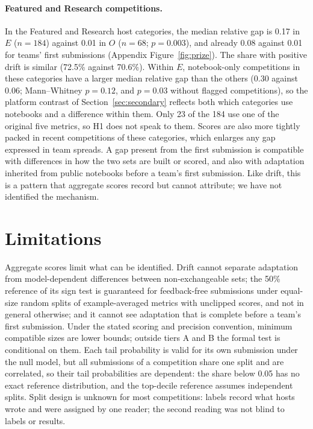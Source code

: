 \documentclass[10pt]{article}
\begin{document}
\paragraph{Featured and Research competitions.} In the Featured and Research host categories, the median relative gap is 0.17 in $E$ ($n=184$) against 0.01 in $O$ ($n=68$; $p=0.003$), and already 0.08 against 0.01 for teams' first submissions (Appendix Figure~\ref{fig:prize}). The share with positive drift is similar (72.5\% against 70.6\%). Within $E$, notebook-only competitions in these categories have a larger median relative gap than the others (0.30 against 0.06; Mann--Whitney $p=0.12$, and $p=0.03$ without flagged competitions), so the platform contrast of Section~\ref{sec:secondary} reflects both which categories use notebooks and a difference within them. Only 23 of the 184 use one of the original five metrics, so H1 does not speak to them. Scores are also more tightly packed in recent competitions of these categories, which enlarges any gap expressed in team spreads. A gap present from the first submission is compatible with differences in how the two sets are built or scored, and also with adaptation inherited from public notebooks before a team's first submission. Like drift, this is a pattern that aggregate scores record but cannot attribute; we have not identified the mechanism.



\section{Limitations}

Aggregate scores limit what can be identified. Drift cannot separate adaptation from model-dependent differences between non-exchangeable sets; the 50\% reference of its sign test is guaranteed for feedback-free submissions under equal-size random splits of example-averaged metrics with unclipped scores, and not in general otherwise; and it cannot see adaptation that is complete before a team's first submission. Under the stated scoring and precision convention, minimum compatible sizes are lower bounds; outside tiers A and B the formal test is conditional on them. Each tail probability is valid for its own submission under the null model, but all submissions of a competition share one split and are correlated, so their tail probabilities are dependent: the share below 0.05 has no exact reference distribution, and the top-decile reference assumes independent splits. Split design is unknown for most competitions: labels record what hosts wrote and were assigned by one reader; the second reading was not blind to labels or results.
\end{document}
